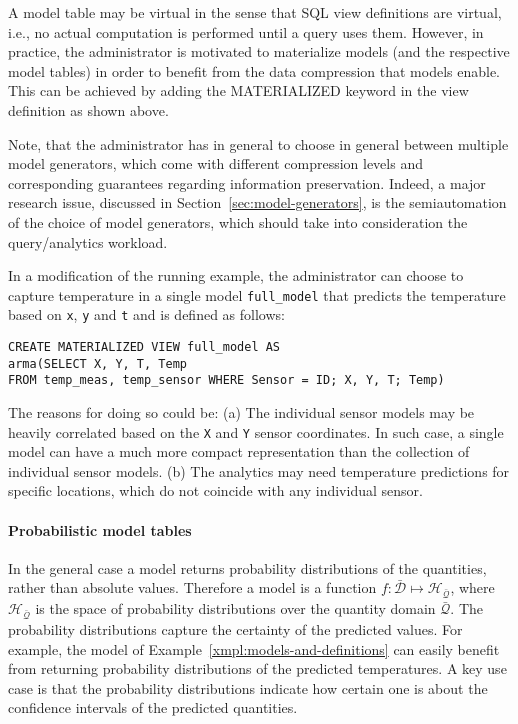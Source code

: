 A model table may be virtual in the sense that SQL view definitions are virtual, i.e., no actual computation is performed until a query uses them. However, in practice, the administrator is motivated to materialize models (and the  respective model tables) in order to benefit from the data compression that models enable. This can be achieved by adding the MATERIALIZED keyword in the view definition as shown above.

Note, that the administrator has in general to choose in general between multiple model generators, which come with different compression levels and corresponding guarantees regarding information preservation. Indeed, a major research issue, discussed in Section~\ref{sec:model-generators}, is the semiautomation of the choice of model generators, which should take into consideration the query/analytics workload.

\vspace*{0.5cm}
\begin{example}
In a modification of the running example, the administrator can choose to capture temperature in a single model \texttt{full\_model} that predicts the temperature based on \texttt{x}, \texttt{y} and \texttt{t} and is defined as follows:
\begin{verbatim}
CREATE MATERIALIZED VIEW full_model AS 
arma(SELECT X, Y, T, Temp
FROM temp_meas, temp_sensor WHERE Sensor = ID; X, Y, T; Temp)
\end{verbatim}

The reasons for doing so could be: (a) The individual sensor models may be heavily correlated based on the \texttt{X} and \texttt{Y} sensor coordinates. In such case, a single model can have a much more compact representation than the collection of individual sensor models.
(b) The analytics may need temperature predictions for specific locations, which do not coincide with any individual sensor.
\end{example}
\vspace*{0.5cm}


\paragraph{Probabilistic model tables} In the general case a model returns probability distributions of the quantities, rather than absolute values. Therefore a model is a function $f:\mathcal{\bar{D}}\mapsto \mathcal{H_{\bar{Q}}}$, where $\mathcal{H_{\bar{Q}}}$ is the space of probability distributions over the quantity domain $\mathcal{\bar{Q}}$. The probability distributions capture the certainty of the predicted values.  For example, the model of Example~\ref{xmpl:models-and-definitions} can easily benefit from returning probability distributions of the predicted temperatures. A key use case is that the probability distributions indicate how certain one is about the confidence intervals of the predicted quantities.

